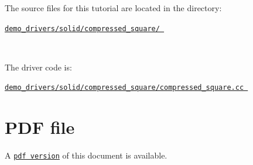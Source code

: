 \begin{DoxyItemize}
\item The source files for this tutorial are located in the directory\+:~\newline
~\newline
\begin{center} \href{../../../../demo_drivers/solid/compressed_square/}{\tt demo\+\_\+drivers/solid/compressed\+\_\+square/ } \end{center} ~\newline

\item The driver code is\+: ~\newline
~\newline
\begin{center} \href{../../../../demo_drivers/solid/compressed_square/compressed_square.cc}{\tt demo\+\_\+drivers/solid/compressed\+\_\+square/compressed\+\_\+square.\+cc } \end{center} 
\end{DoxyItemize}



 

 \hypertarget{index_pdf}{}\section{P\+D\+F file}\label{index_pdf}
A \href{../latex/refman.pdf}{\tt pdf version} of this document is available. 
